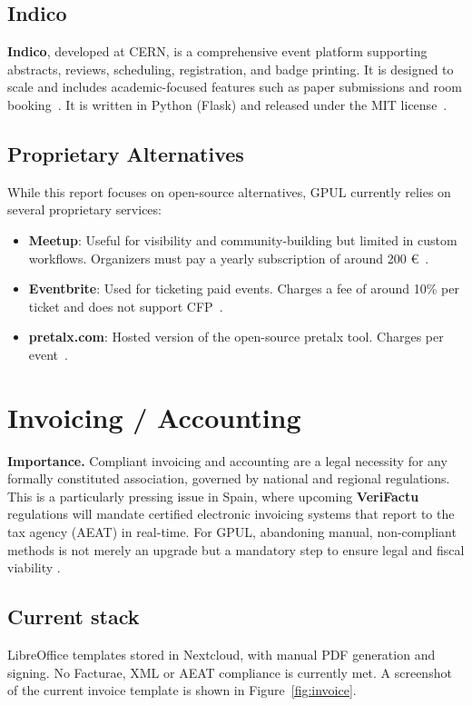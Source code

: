 \subsection*{Indico}
\textbf{Indico}, developed at CERN, is a comprehensive event platform supporting abstracts, reviews, scheduling, registration, and badge printing. It is designed to scale and includes academic-focused features such as paper submissions and room booking~\cite{indico-github}. It is written in Python (Flask) and released under the MIT license~\cite{indico-faq}.

\subsection*{Proprietary Alternatives}
While this report focuses on open-source alternatives, GPUL currently relies on several proprietary services:

\begin{itemize}
  \item \textbf{Meetup}: Useful for visibility and community-building but limited in custom workflows. Organizers must pay a yearly subscription of around 200 €~\cite{meetup-wiki}.
  \item \textbf{Eventbrite}: Used for ticketing paid events. Charges a fee of around 10\% per ticket and does not support CFP~\cite{eventbrite-wiki}.
  \item \textbf{pretalx.com}: Hosted version of the open-source pretalx tool. Charges per event~\cite{pretalx-pricing}.
\end{itemize}

\section{Invoicing / Accounting}

\textbf{Importance.} Compliant invoicing and accounting are a legal necessity for any formally constituted association, governed by national and regional regulations. This is a particularly pressing issue in Spain, where upcoming \textbf{VeriFactu} regulations will mandate certified electronic invoicing systems that report to the tax agency (AEAT) in real-time. For GPUL, abandoning manual, non-compliant methods is not merely an upgrade but a mandatory step to ensure legal and fiscal viability \cite{OdooBlogVerifactu, SageVerifactu}.

\subsection*{Current stack}
LibreOffice templates stored in Nextcloud, with manual PDF generation and signing. No Facturae, XML or AEAT compliance is currently met. A screenshot of the current invoice template is shown in Figure~\ref{fig:invoice}.

